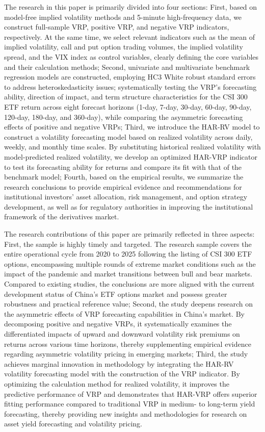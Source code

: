 \documentclass[a4paper, 12pt]{article}    %
\begin{document}
The research in this paper is primarily divided into four sections: First, based on model-free implied volatility methods and 5-minute high-frequency data, we construct full-sample VRP, positive VRP, and negative VRP indicators, respectively. At the same time, we select relevant indicators such as the mean of implied volatility, call and put option trading volumes, the implied volatility spread, and the VIX index as control variables, clearly defining the core variables and their calculation methods; Second, univariate and multivariate benchmark regression models are constructed, employing HC3 White robust standard errors to address heteroskedasticity issues; systematically testing the VRP’s forecasting ability, direction of impact, and term structure characteristics for the CSI 300 ETF return across eight forecast horizons (1-day, 7-day, 30-day, 60-day, 90-day, 120-day, 180-day, and 360-day), while comparing the asymmetric forecasting effects of positive and negative VRPs; Third, we introduce the HAR-RV model to construct a volatility forecasting model based on realized volatility across daily, weekly, and monthly time scales. By substituting historical realized volatility with model-predicted realized volatility, we develop an optimized HAR-VRP indicator to test its forecasting ability for returns and compare its fit with that of the benchmark model; Fourth, based on the empirical results, we summarize the research conclusions to provide empirical evidence and recommendations for institutional investors’ asset allocation, risk management, and option strategy development, as well as for regulatory authorities in improving the institutional framework of the derivatives market.

The research contributions of this paper are primarily reflected in three aspects: First, the sample is highly timely and targeted. The research sample covers the entire operational cycle from 2020 to 2025 following the listing of CSI 300 ETF options, encompassing multiple rounds of extreme market conditions such as the impact of the pandemic and market transitions between bull and bear markets. Compared to existing studies, the conclusions are more aligned with the current development status of China’s ETF options market and possess greater robustness and practical reference value; Second, the study deepens research on the asymmetric effects of VRP forecasting capabilities in China’s market. By decomposing positive and negative VRPs, it systematically examines the differentiated impacts of upward and downward volatility risk premiums on returns across various time horizons, thereby supplementing empirical evidence regarding asymmetric volatility pricing in emerging markets; Third, the study achieves marginal innovation in methodology by integrating the HAR-RV volatility forecasting model with the construction of the VRP indicator. By optimizing the calculation method for realized volatility, it improves the predictive performance of VRP and demonstrates that HAR-VRP offers superior fitting performance compared to traditional VRP in medium- to long-term yield forecasting, thereby providing new insights and methodologies for research on asset yield forecasting and volatility pricing.
\end{document}
